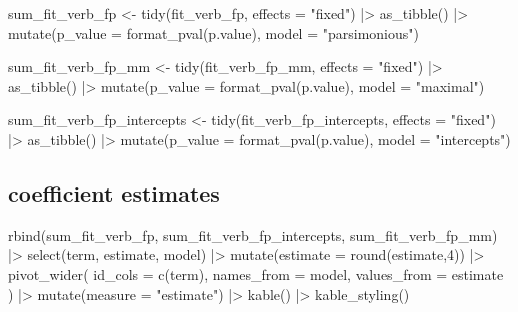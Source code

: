 \documentclass[
  letterpaper,
  DIV=11,
  numbers=noendperiod]{scrartcl}
\newenvironment{Shaded}{\begin{snugshade}}{\end{snugshade}}
\newcommand{\AttributeTok}[1]{\textcolor[rgb]{0.40,0.45,0.13}{#1}}
\newcommand{\DecValTok}[1]{\textcolor[rgb]{0.68,0.00,0.00}{#1}}
\newcommand{\FunctionTok}[1]{\textcolor[rgb]{0.28,0.35,0.67}{#1}}
\newcommand{\NormalTok}[1]{\textcolor[rgb]{0.00,0.23,0.31}{#1}}
\newcommand{\OtherTok}[1]{\textcolor[rgb]{0.00,0.23,0.31}{#1}}
\newcommand{\SpecialCharTok}[1]{\textcolor[rgb]{0.37,0.37,0.37}{#1}}
\newcommand{\StringTok}[1]{\textcolor[rgb]{0.13,0.47,0.30}{#1}}
\begin{document}
\begin{Shaded}
\begin{Highlighting}[]
\NormalTok{sum\_fit\_verb\_fp }\OtherTok{\textless{}{-}}
  \FunctionTok{tidy}\NormalTok{(fit\_verb\_fp,}
     \AttributeTok{effects =} \StringTok{"fixed"}\NormalTok{) }\SpecialCharTok{|\textgreater{}} 
  \FunctionTok{as\_tibble}\NormalTok{() }\SpecialCharTok{|\textgreater{}} 
  \FunctionTok{mutate}\NormalTok{(}\AttributeTok{p\_value =} \FunctionTok{format\_pval}\NormalTok{(p.value),}
         \AttributeTok{model =} \StringTok{"parsimonious"}\NormalTok{) }

\NormalTok{sum\_fit\_verb\_fp\_mm }\OtherTok{\textless{}{-}}
  \FunctionTok{tidy}\NormalTok{(fit\_verb\_fp\_mm,}
     \AttributeTok{effects =} \StringTok{"fixed"}\NormalTok{) }\SpecialCharTok{|\textgreater{}} 
  \FunctionTok{as\_tibble}\NormalTok{() }\SpecialCharTok{|\textgreater{}} 
  \FunctionTok{mutate}\NormalTok{(}\AttributeTok{p\_value =} \FunctionTok{format\_pval}\NormalTok{(p.value),}
         \AttributeTok{model =} \StringTok{"maximal"}\NormalTok{) }

\NormalTok{sum\_fit\_verb\_fp\_intercepts }\OtherTok{\textless{}{-}}
  \FunctionTok{tidy}\NormalTok{(fit\_verb\_fp\_intercepts,}
     \AttributeTok{effects =} \StringTok{"fixed"}\NormalTok{) }\SpecialCharTok{|\textgreater{}} 
  \FunctionTok{as\_tibble}\NormalTok{() }\SpecialCharTok{|\textgreater{}} 
  \FunctionTok{mutate}\NormalTok{(}\AttributeTok{p\_value =} \FunctionTok{format\_pval}\NormalTok{(p.value),}
         \AttributeTok{model =} \StringTok{"intercepts"}\NormalTok{)}
\end{Highlighting}
\end{Shaded}

\hypertarget{coefficient-estimates}{%
\subsection{coefficient estimates}\label{coefficient-estimates}}

\begin{Shaded}
\begin{Highlighting}[]
\FunctionTok{rbind}\NormalTok{(sum\_fit\_verb\_fp, sum\_fit\_verb\_fp\_intercepts, sum\_fit\_verb\_fp\_mm) }\SpecialCharTok{|\textgreater{}} 
  \FunctionTok{select}\NormalTok{(term, estimate, model) }\SpecialCharTok{|\textgreater{}}
  \FunctionTok{mutate}\NormalTok{(}\AttributeTok{estimate =} \FunctionTok{round}\NormalTok{(estimate,}\DecValTok{4}\NormalTok{)) }\SpecialCharTok{|\textgreater{}} 
  \FunctionTok{pivot\_wider}\NormalTok{(}
    \AttributeTok{id\_cols =} \FunctionTok{c}\NormalTok{(term),}
    \AttributeTok{names\_from =}\NormalTok{ model,}
    \AttributeTok{values\_from =}\NormalTok{ estimate}
\NormalTok{  ) }\SpecialCharTok{|\textgreater{}} 
  \FunctionTok{mutate}\NormalTok{(}\AttributeTok{measure =} \StringTok{"estimate"}\NormalTok{) }\SpecialCharTok{|\textgreater{}} 
  \FunctionTok{kable}\NormalTok{() }\SpecialCharTok{|\textgreater{}} 
  \FunctionTok{kable\_styling}\NormalTok{()}
\end{Highlighting}
\end{Shaded}
\end{document}
